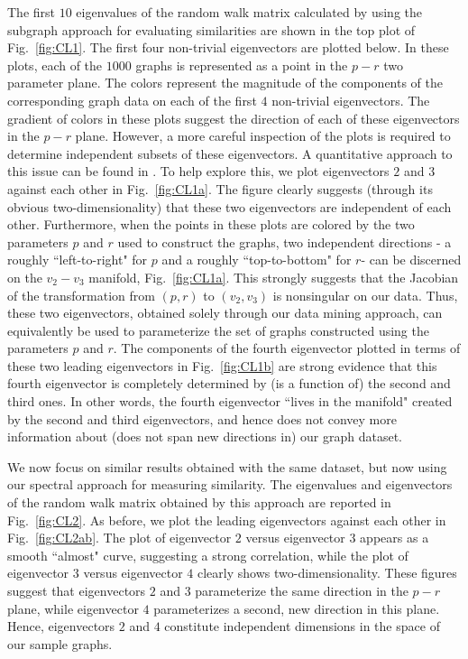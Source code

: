 The first $10$ eigenvalues of the random walk matrix calculated by
using the subgraph approach for evaluating similarities are shown in
the top plot of Fig.~\ref{fig:CL1}.
% 
The first four non-trivial eigenvectors are plotted below.
% 
In these plots, each of the $1000$ graphs is represented as a point in
the $p-r$ two parameter plane.
% 
The colors represent the magnitude of the components of the
corresponding graph data on each of the first $4$ non-trivial
eigenvectors.
% 
The gradient of colors in these plots suggest the direction of each of
these eigenvectors in the $p-r$ plane.
% 
However, a more careful inspection of the plots is required to
determine independent subsets of these eigenvectors. A quantitative
approach to this issue can be found in \cite{dsilva2015parsimonious}.
% 
To help explore this, we plot eigenvectors $2$ and $3$ against each
other in Fig.~\ref{fig:CL1a}.
% 
The figure clearly suggests (through its obvious two-dimensionality)
that these two eigenvectors are independent of each other.
% 
Furthermore, when the points in these plots are colored by the two
parameters $p$ and $r$ used to construct the graphs, two independent
directions - a roughly ``left-to-right" for $p$ and a roughly
``top-to-bottom" for $r$- can be discerned on the $v_2 - v_3$
manifold, Fig.~\ref{fig:CL1a}.
% 
This strongly suggests that the Jacobian of the transformation from
$(p,r)$ to $(v_2,v_3)$ is nonsingular on our data.
% 
Thus, these two eigenvectors, obtained solely through our data mining
approach, can equivalently be used to parameterize the set of graphs
constructed using the parameters $p$ and $r$.
% 
The components of the fourth eigenvector plotted in terms of these two
leading eigenvectors in Fig.~\ref{fig:CL1b} are strong evidence that
this fourth eigenvector is completely determined by (is a function of)
the second and third ones.
% 
In other words, the fourth eigenvector ``lives in the manifold"
created by the second and third eigenvectors, and hence does not
convey more information about (does not span new directions in) our
graph dataset.


We now focus on similar results obtained with the same dataset, but
now using our spectral approach for measuring similarity.
% 
The eigenvalues and eigenvectors of the random walk matrix obtained by
this approach are reported in Fig.~\ref{fig:CL2}.
% 
As before, we plot the leading eigenvectors against each other in
Fig.~\ref{fig:CL2ab}.
% 
The plot of eigenvector $2$ versus eigenvector $3$ appears as a smooth
``almost" curve, suggesting a strong correlation, while the plot of
eigenvector $3$ versus eigenvector $4$ clearly shows
two-dimensionality.
% 
These figures suggest that eigenvectors $2$ and $3$ parameterize the
same direction in the $p-r$ plane, while eigenvector $4$ parameterizes
a second, new direction in this plane.
% 
Hence, eigenvectors $2$ and $4$ constitute independent dimensions in
the space of our sample graphs.
% 

